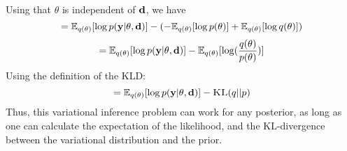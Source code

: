 Using that $\theta$ is independent of $\mathbf{d}$, we have
\begin{equation}= \mathbb{E}_{q(\theta)}[\log p(\mathbf{y}| \theta , \mathbf{d})]-(-\mathbb{E}_{q(\theta)}[\log p(\theta)] + \mathbb{E}_{q(\theta)}[\log q(\theta)])\end{equation}
\begin{equation}= \mathbb{E}_{q(\theta)}[\log p(\mathbf{y}| \theta , \mathbf{d})]-\mathbb{E}_{q(\theta)}[\log (\frac{q(\theta)}{p(\theta)})]\end{equation}
Using the definition of the KLD:
\begin{equation}\label{eq:elbo-3}= \mathbb{E}_{q(\theta)}[\log p(\mathbf{y}| \theta , \mathbf{d})]- \textsc{KL}(q || p)\end{equation} 
Thus, this variational inference problem can work for any posterior, as long as one can calculate the expectation of the likelihood, and the KL-divergence between the variational distribution and the prior.
